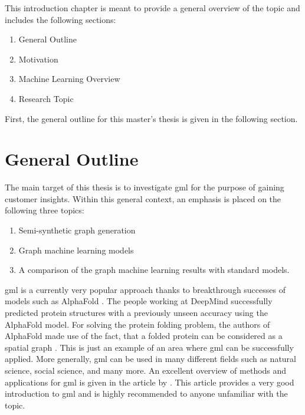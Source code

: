 	
	This introduction chapter is meant to provide a general overview of the
	topic and includes the following sections:

	\begin{enumerate}
		\item General Outline
		\item Motivation
		\item Machine Learning Overview
		\item Research Topic
	\end{enumerate}

	\noindent First, the general outline for this master's thesis is given in
	the following section.
	
	\section{General Outline}

	The main target of this thesis is to investigate \ac{gml} for the purpose 
	of gaining customer insights. Within this general context, an emphasis is 
	placed on the following three topics:

	\begin{enumerate}
		\item Semi-synthetic graph generation
		\item Graph machine learning models
		\item A comparison of the graph machine learning results with standard
			models.
	\end{enumerate}

	\noindent \acs{gml} is a currently very popular approach 
	thanks to breakthrough successes of models such as AlphaFold 
	\citep{senior2020improved}. The people working at DeepMind successfully
	predicted protein structures with a previously unseen accuracy using the 
	AlphaFold model. For solving the protein folding problem, the authors of
	AlphaFold made use of the fact, that a folded protein can be considered as
	a spatial graph \citep{AlphaFoldTeam2020}. This is just an example of an
	area where \acs{gml} can be successfully applied. More generally, \acs{gml} 
	can be used in many different fields such as natural science, social science, 
	and many more. An excellent overview of methods and applications for
	\acs{gml} is given in the article by \cite{zhou2020graph}. This article 
	provides a very good introduction to \acs{gml} and is highly recommended to 
	anyone unfamiliar with the topic. \\

